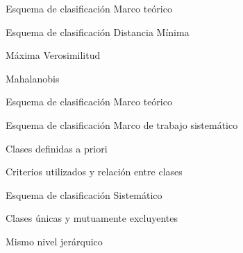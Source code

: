 \begin{frame}{}
\begin{block}{Esquema de clasificación}
  Marco teórico
\end{block}

\end{frame}
\begin{frame}{}
\begin{block}{Esquema de clasificación}
  Distancia Mínima\pause

  Máxima Verosimilitud \pause
  
  Mahalanobis 
\end{block}

\end{frame}
\begin{frame}{}
\begin{block}{Esquema de clasificación}
  Marco teórico
\end{block}

\end{frame}
\begin{frame}{}
\begin{block}{Esquema de clasificación}
  Marco de trabajo sistemático\pause

  Clases definidas a priori \pause
  
  Criterios utilizados y relación entre clases 
\end{block}

\end{frame}

\begin{frame}{}
\begin{block}{Esquema de clasificación}
 Sistemático\pause

  Clases únicas y mutuamente excluyentes\pause
  
  Mismo nivel jerárquico 
\end{block}

\end{frame}

